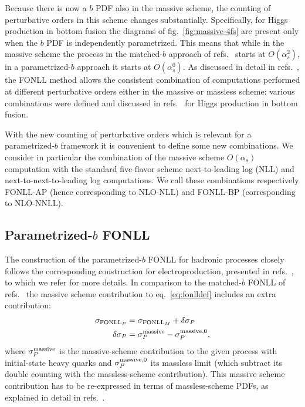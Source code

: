 Because there is now a $b$ PDF also in the massive scheme, the
counting of perturbative orders in this scheme
changes substantially. Specifically, for Higgs production in bottom
fusion the diagrams of fig.~\ref{fig:massive-4fs} are present only
when the $b$ PDF is independently parametrized. This means that while 
in the
massive scheme the process in the matched-$b$ approach of
refs.~\cite{Forte:2015hba,Forte:2016sja}  starts at $O(\alpha_s^2)$,
in a parametrized-$b$ approach it starts at 
$O(\alpha_s^0)$. As discussed in detail in
refs.~\cite{Forte:2010ta,Forte:2015hba,Forte:2016sja},
the FONLL method allows the  consistent combination of computations performed
at different perturbative orders either in the massive or massless
scheme: various combinations were defined and discussed  in
refs.~\cite{Forte:2015hba,Forte:2016sja} for Higgs production in
bottom fusion.

With the new counting of perturbative orders which is relevant for a
parametrized-$b$ framework it is convenient to define some new
combinations. We  consider in particular the combination of 
the massive scheme $O(\alpha_s)$ computation  with the standard
five-flavor scheme next-to-leading log (NLL) and
next-to-next-to-leading log  computations. We  call these
combinations respectively FONLL-AP (hence corresponding to NLO-NLL)
and FONLL-BP (corresponding to  NLO-NNLL).


\subsection{Parametrized-$b$ FONLL}
\label{sec:parbfonll}

The construction of the parametrized-$b$ FONLL for hadronic processes
closely follows the corresponding construction for electroproduction,
presented in refs.~\cite{Ball:2015tna,Ball:2015dpa}, to which we refer
for more details. In comparison to the matched-$b$ FONLL of
refs.~\cite{Forte:2015hba,Forte:2016sja} the massive scheme
contribution to eq.~\eqref{eq:fonlldef} includes an extra contribution:
\begin{align}
  \label{eq:delta-i}
  \sigma_{\text{FONLL}_P} &= \sigma_{\text{FONLL}_M} +
  \delta\sigma_P\nonumber\\ 
  \quad \quad \delta\sigma_P &= \sigma^{\rm massive}_{P} - \sigma^{{\rm
      massive},0}_{P},
\end{align}
where $\sigma^{\rm massive}_{P}$ is the massive-scheme contribution to
the given process with initial-state heavy quarks and $\sigma^{{\rm
      massive},0}_{P}$ its massless limit (which subtract its double
counting with the massless-scheme contribution). This massive scheme
contribution has to be re-expressed in terms of massless-scheme PDFs,
as explained in detail in
refs.~\cite{Cacciari:1998it,Forte:2010ta,Ball:2015tna,Ball:2015dpa,Forte:2015hba,Forte:2016sja}.

